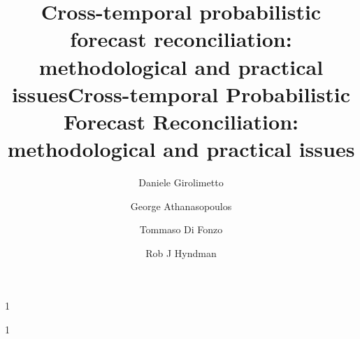 \documentclass[review, 11pt]{elsarticle}
\newcommand{\blind}{1}
\theoremstyle{definition}
\begin{document}
%


\begin{frontmatter}

\blind
{
  \title{\LARGE\textbf{Cross-temporal probabilistic forecast reconciliation}: methodological and practical issues}
  \author[ita]{Daniele Girolimetto}
  \author[aus]{George Athanasopoulos}
  \author[ita]{Tommaso Di Fonzo}
  \author[aus]{Rob J Hyndman}


  \address[ita]{Department of Statistical Sciences, University of Padua, Padova 35121, Italy}
  \address[aus]{Department of Econometrics \& Business Statistics, Monash University, Clayton VIC 3800, Australia}
} \fi

\blind
{
  \title{\LARGE\textbf{Cross-temporal Probabilistic Forecast Reconciliation}: methodological and practical issues}
} \fi


\end{frontmatter}
\end{document}
